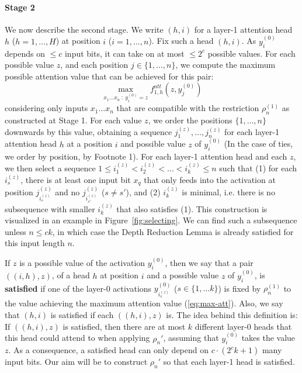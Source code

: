 \documentclass[11pt,a4paper]{article}
\newcommand{\key}[1]{\textbf{#1}}
\begin{document}
\paragraph{Stage 2}
We now describe the second stage.
We write $(h,i)$ for a layer-1 attention head $h$ ($h=1,\dots, H$) at position $i$ ($i=1, \dots, n$).
Fix such a head $(h,i)$.
As $y^{(0)}_i$ depends on $\leq c$ input bits, it can take on at most $\leq 2^c$ possible values.
For each possible value $z$,  and each position $j \in \{1, \dots, n\}$, we compute the maximum possible attention value that can be achieved for this pair:
\begin{equation}\label{eq:max-att}
\max_{x_1\dots x_n\ :\ y^{(0)}_i=z} f^{att}_{1,h}(z, y^{(0)}_j)
\end{equation}
considering only inputs $x_1\dots x_n$ that are compatible with the restriction $\rho^{(1)}_n$ as constructed at Stage 1.
For each value $z$, we order the positions $\{1, \dots, n\}$ downwards by this value, obtaining a sequence $j_1^{(z)}, \dots, j_n^{(z)}$ for each layer-1 attention head $h$ at a position $i$ and possible value $z$ of $y^{(0)}_i$ (In the case of ties, we order by  position, by Footnote 1).
For each layer-1 attention head and each $z$, we then select a sequence $1 \leq i_1^{(z)} < i_2^{(z)} < \dots < i_{k}^{(z)} \leq n$ such that (1) for each $i_s^{(z)}$, there is at least one input bit $x_q$ that only feeds into the activation at position $j_{i_s^{(z)}}^{(z)}$ and no $j_{i_{s'}^{(z)}}^{(z)}$ ($s\neq s'$), and (2) $i_{k}^{(z)}$ is minimal, i.e. there is no subsequence with smaller $i_{k}^{(z)}$ that also satisfies (1).
This construction is visualized in an example in Figure~\ref{fig:selecting}.
We can find such a subsequence unless $n \leq ck$, in which case the Depth Reduction Lemma is already satisfied for this input length $n$.

If $z$ is a possible value of the activation $y^{(0)}_i$, then we
say that a pair $((i,h),z)$, of a head $h$ at position $i$ and a possible value $z$ of $y^{(0)}_i$, is \key{satisfied} if one of the layer-0 activations $y^{(0)}_{i_s^{(z)}}$ ($s \in \{1, \dots k\}$) is fixed by $\rho^{(1)}_n$ to the value achieving the maximum attention value (\ref{eq:max-att}).
Also, we say that $(h,i)$ is satisfied if each $((h,i),z)$ is.
The idea behind this definition is: If $((h,i),z)$ is satisfied, then there are at most $k$ different layer-0 heads that this head could attend to when applying $\rho_n'$, assuming that $y^{(0)}_i$ takes the value $z$.
As a consequence, a satisfied head can only depend on $ c\cdot (2^ck+1)$ many input bits.
Our aim will be to construct $\rho_n'$ so that each layer-1 head is satisfied.
\end{document}
